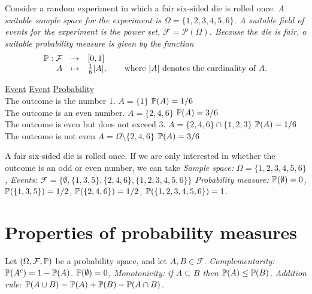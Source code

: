 \begin{example}
Consider a random experiment in which a fair six-sided die is rolled once.
\bit
\it A suitable sample space for the experiment is $\Omega=\{1,2,3,4,5,6\}$.
\it A suitable field of events for the experiment is the power set, $\mathcal{F} = \mathcal{P}(\Omega)$.
\it Because the die is fair, a suitable probability measure is given by the function
\[\begin{array}{rcl}
\mathbb{P}:	\mathcal{F} & \to 		& [0,1] \\
		A			& \mapsto 	& \frac{1}{6}|A|, \qquad\text{where $|A|$ denotes the cardinality of $A$.}

\end{array}\] 
\eit

\begin{tabbing}
\underline{Event}\qquad\qquad\qquad\qquad\qquad\qquad\qquad\qquad\qquad
	\=\underline{Event}\qquad\qquad\qquad\qquad\qquad
	\=\underline{Probability} \\
The outcome is the number $1$.	\> $A = \{1\}$ \> $\mathbb{P}(A) = 1/6$\\
The outcome is an even number.	\> $A = \{2,4,6\}$  \> $\mathbb{P}(A) = 3/6$\\
The outcome is even but does not exceed $3$.	\> $A = \{2,4,6\}\cap\{1,2,3\}$  \> $\mathbb{P}(A) = 1/6$\\
The outcome is not even			\> $A = \Omega\setminus\{2,4,6\}$ \> $\mathbb{P}(A) = 3/6$
\end{tabbing}
\end{example}

\newpage
\break
\begin{example}
A fair six-sided die is rolled once. If we are only interested in whether the outcome is an odd or even number, we can take
\bit
\it Sample space: $\Omega=\{1,2,3,4,5,6\}$,
\it Events: $\mathcal{F} = \big\{\emptyset,\{1,3,5\},\{2,4,6\},\{1,2,3,4,5,6\}\big\}$
\it Probability measure: $\mathbb{P}(\emptyset)=0$, $\mathbb{P}(\{1,3,5\})=1/2$, $\mathbb{P}(\{2,4,6\})=1/2$, $\mathbb{P}(\{1,2,3,4,5,6\})=1$.
\eit
\end{example}

\section{Properties of probability measures}

\begin{theorem}\label{thm:properties_of_probability_measures}
Let $(\Omega,\mathcal{F},\mathbb{P})$ be a probability space, and let $A,B\in\mathcal{F}$. 
\ben
\it Complementarity: $\mathbb{P}(A^c) = 1 - \mathbb{P}(A)$.
\it $\mathbb{P}(\emptyset) = 0$,
\it Monotonicity: if $A\subseteq B$ then $\mathbb{P}(A)\leq \mathbb{P}(B)$.
\it Addition rule: $\mathbb{P}(A\cup B) = \mathbb{P}(A) + \mathbb{P}(B) - \mathbb{P}(A\cap B)$.
\een
\end{theorem}

